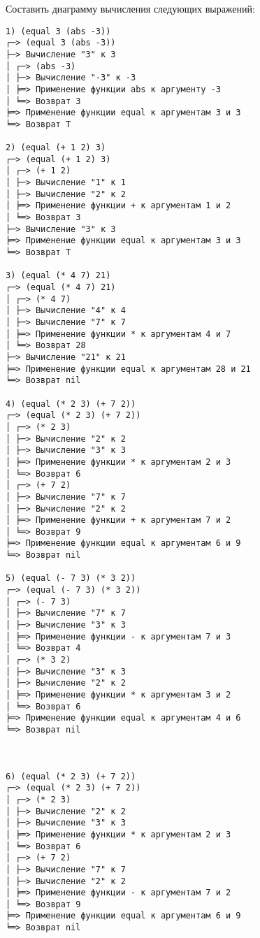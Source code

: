 Составить диаграмму вычисления следующих выражений:


\begin{verbatim}
1) (equal 3 (abs -3))
┌─> (equal 3 (abs -3))
├─> Вычисление "3" к 3
│ ┌─> (abs -3)
│ ├─> Вычисление "-3" к -3
│ ╞═> Применение функции abs к аргументу -3
│ ╘═> Возврат 3
╞═> Применение функции equal к аргументам 3 и 3
╘═> Возврат T

2) (equal (+ 1 2) 3)
┌─> (equal (+ 1 2) 3)
│ ┌─> (+ 1 2)
│ ├─> Вычисление "1" к 1
│ ├─> Вычисление "2" к 2
│ ╞═> Применение функции + к аргументам 1 и 2
│ ╘═> Возврат 3
├─> Вычисление "3" к 3
╞═> Применение функции equal к аргументам 3 и 3
╘═> Возврат T

3) (equal (* 4 7) 21)
┌─> (equal (* 4 7) 21)
│ ┌─> (* 4 7)
│ ├─> Вычисление "4" к 4
│ ├─> Вычисление "7" к 7
│ ╞═> Применение функции * к аргументам 4 и 7
│ ╘═> Возврат 28
├─> Вычисление "21" к 21
╞═> Применение функции equal к аргументам 28 и 21
╘═> Возврат nil

4) (equal (* 2 3) (+ 7 2))
┌─> (equal (* 2 3) (+ 7 2))
│ ┌─> (* 2 3)
│ ├─> Вычисление "2" к 2
│ ├─> Вычисление "3" к 3
│ ╞═> Применение функции * к аргументам 2 и 3
│ ╘═> Возврат 6
│ ┌─> (+ 7 2)
│ ├─> Вычисление "7" к 7
│ ├─> Вычисление "2" к 2
│ ╞═> Применение функции + к аргументам 7 и 2
│ ╘═> Возврат 9
╞═> Применение функции equal к аргументам 6 и 9
╘═> Возврат nil

5) (equal (- 7 3) (* 3 2))
┌─> (equal (- 7 3) (* 3 2))
│ ┌─> (- 7 3)
│ ├─> Вычисление "7" к 7
│ ├─> Вычисление "3" к 3
│ ╞═> Применение функции - к аргументам 7 и 3
│ ╘═> Возврат 4
│ ┌─> (* 3 2)
│ ├─> Вычисление "3" к 3
│ ├─> Вычисление "2" к 2
│ ╞═> Применение функции * к аргументам 3 и 2
│ ╘═> Возврат 6
╞═> Применение функции equal к аргументам 4 и 6
╘═> Возврат nil



6) (equal (* 2 3) (+ 7 2))
┌─> (equal (* 2 3) (+ 7 2))
│ ┌─> (* 2 3)
│ ├─> Вычисление "2" к 2
│ ├─> Вычисление "3" к 3
│ ╞═> Применение функции * к аргументам 2 и 3
│ ╘═> Возврат 6
│ ┌─> (+ 7 2)
│ ├─> Вычисление "7" к 7
│ ├─> Вычисление "2" к 2
│ ╞═> Применение функции - к аргументам 7 и 2
│ ╘═> Возврат 9
╞═> Применение функции equal к аргументам 6 и 9
╘═> Возврат nil
\end{verbatim}

